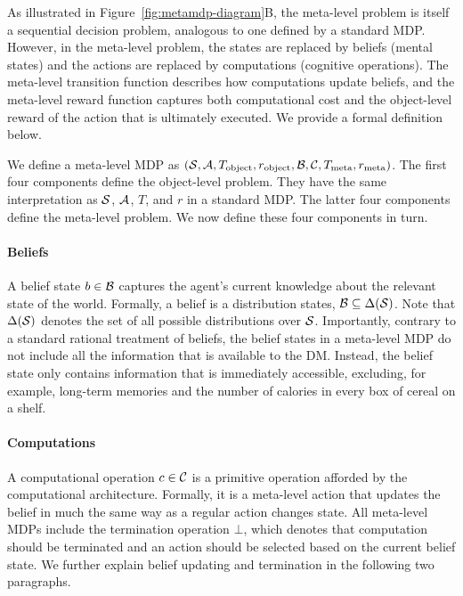 As illustrated in Figure~\ref{fig:metamdp-diagram}B, the meta-level problem is itself a sequential decision problem, analogous to one defined by a standard MDP. However, in the meta-level problem, the states are replaced by beliefs (mental states) and the actions are replaced by computations (cognitive operations). The meta-level transition function describes how computations update beliefs, and the meta-level reward function captures both computational cost and the object-level reward of the action that is ultimately executed. We provide a formal definition below.

We define a meta-level MDP as $(\S, \A, T\object, r\object, \B, \C, T\meta, r\meta)$. The first four components define the object-level problem. They have the same interpretation as $\S$, $\A$, $T$, and $r$ in a standard MDP. The latter four components define the meta-level problem. We now define these four components in turn.

\paragraph{Beliefs}
A belief state $b \in \B$ captures the agent's current knowledge about the relevant state of the world. Formally, a belief is a distribution states, $\B \subseteq \Delta(\S)$. Note that $\Delta(\S)$ denotes the set of all possible distributions over $\S$.
Importantly, contrary to a standard rational treatment of beliefs, the belief states in a meta-level MDP do not include all the information that is available to the DM. Instead, the belief state only contains information that is immediately accessible, excluding, for example, long-term memories and the number of calories in every box of cereal on a shelf.

\paragraph{Computations}
A computational operation $c \in \C$ is a primitive operation afforded by the computational architecture. Formally, it is a meta-level action that updates the belief in much the same way as a regular action changes state. All meta-level MDPs include the termination operation $\bot$, which denotes that computation should be terminated and an action should be selected based on the current belief state. We further explain belief updating and termination in the following two paragraphs.

